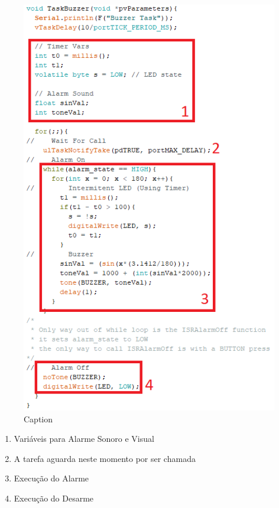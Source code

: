 \begin{figure}[H]
    \centering
    \includegraphics[scale=0.5]{images/codigo/sisBD_buzzer.png}
    \caption{Caption}
    \label{fig:my_label}
\end{figure}

\begin{enumerate}
    \item Variáveis para Alarme Sonoro e Visual
    \item A tarefa aguarda neste momento por ser chamada
    \item Execução do Alarme
    \item Execução do Desarme
\end{enumerate}